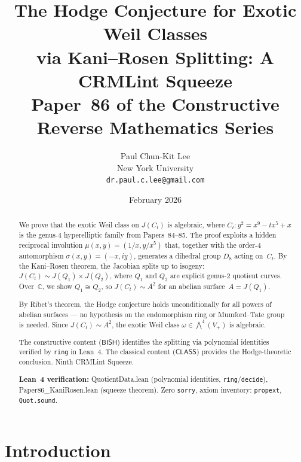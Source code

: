 \documentclass[11pt]{article}
\theoremstyle{plain}
\theoremstyle{definition}
\theoremstyle{remark}
\newcommand{\C}{\mathbb{C}}
\newcommand{\BISH}{\ensuremath{\mathsf{BISH}}}
\newcommand{\CLASS}{\ensuremath{\mathsf{CLASS}}}
\begin{document}
\title{%
  The Hodge Conjecture for Exotic Weil Classes\\
  via Kani--Rosen Splitting: A CRMLint Squeeze\\[4pt]
  \large Paper~86 of the Constructive Reverse Mathematics Series}
\author{%
  Paul Chun-Kit Lee\\
  New York University\\
  \texttt{dr.paul.c.lee@gmail.com}}
\date{February 2026}
\maketitle

\begin{abstract}
We prove that the exotic Weil class on $J(C_t)$ is algebraic,
where $C_t\colon y^2 = x^9 - tx^5 + x$ is the genus-4 hyperelliptic
family from Papers~84--85.  The proof exploits a hidden reciprocal
involution $\mu(x,y) = (1/x, y/x^5)$ that, together with the
order-4 automorphism $\sigma(x,y) = (-x, iy)$, generates a
dihedral group $D_8$ acting on~$C_t$.  By the Kani--Rosen theorem,
the Jacobian splits up to isogeny:
$J(C_t) \sim J(Q_1) \times J(Q_2)$,
where $Q_1$ and $Q_2$ are explicit genus-2 quotient curves.
Over~$\C$, we show $Q_1 \cong Q_2$, so $J(C_t) \sim A^2$ for an
abelian surface~$A = J(Q_1)$.

By Ribet's theorem, the Hodge conjecture holds unconditionally for
all powers of abelian surfaces --- no hypothesis on the endomorphism
ring or Mumford--Tate group is needed.  Since $J(C_t) \sim A^2$,
the exotic Weil class $\omega \in \bigwedge^4(V_+)$ is algebraic.

The constructive content (\BISH) identifies the splitting via
polynomial identities verified by \texttt{ring} in Lean~4.
The classical content (\CLASS) provides the Hodge-theoretic
conclusion.  Ninth CRMLint Squeeze.

\medskip\noindent
\textbf{Lean~4 verification:}
QuotientData.lean (polynomial identities, \texttt{ring}/\texttt{decide}),
Paper86\_KaniRosen.lean (squeeze theorem).
Zero \texttt{sorry}, axiom inventory:
\texttt{propext}, \texttt{Quot.sound}.
\end{abstract}

\section{Introduction}
\label{sec:intro}
\end{document}
